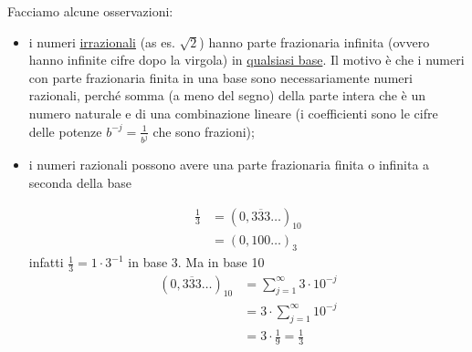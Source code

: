 Facciamo alcune osservazioni:
\begin{itemize}
    \item i numeri \uline{irrazionali} (as es. $\sqrt{2}$) hanno parte frazionaria infinita (ovvero hanno infinite cifre dopo la virgola) in \uline{qualsiasi base}. Il motivo è che i numeri con parte frazionaria finita in una base sono necessariamente numeri razionali, perché somma (a meno del segno) della parte intera che è un numero naturale e di una combinazione lineare (i coefficienti sono le cifre delle potenze $b^{-j} = \frac{1}{b^j}$ che sono frazioni);
    \item i numeri razionali possono avere una parte frazionaria finita o infinita a seconda della base
    \begin{esempio} \end{esempio}
    \[ \begin{split}
        \frac{1}{3} & = (0,\overline{333} \dotsc)_{10} \\
        & = (0,100 \dotsc)_{3}
    \end{split} \]
    infatti $\frac{1}{3} = 1 \cdot 3^{-1}$ in base 3. Ma in base 10
    \[ \begin{split}
        (0,\overline{333} \dotsc)_{10} & = \sum_{j=1}^{\infty} 3 \cdot 10^{-j} \\
        & = 3 \cdot \sum_{j=1}^{\infty} 10^{-j} \\
        & = 3 \cdot \frac{1}{9} = \frac{1}{3} \\
        \end{split} 
        \]
\end{itemize}

